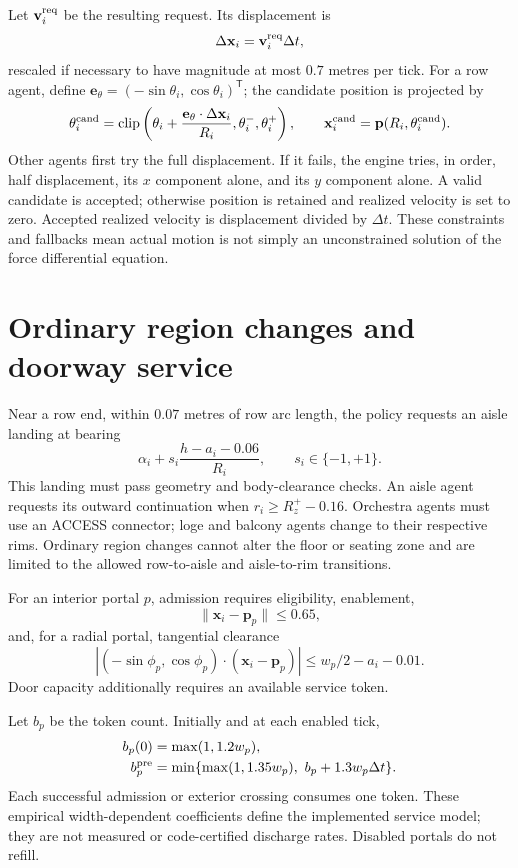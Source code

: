 \documentclass[11pt]{article}
\newcommand{\clip}{\operatorname{clip}}
\begin{document}
Let $\mathbf v_i^{\rm req}$ be the resulting request. Its displacement is
\[
 \Delta\mathbf x_i=\mathbf v_i^{\rm req}\Delta t,
\]
rescaled if necessary to have magnitude at most $0.7$ metres per tick.
For a row agent, define $\mathbf e_\theta=(-\sin\theta_i,\cos\theta_i)^{\mathsf T}$;
the candidate position is projected by
\[
 \theta_i^{\rm cand}=\clip\left(
 \theta_i+\frac{\mathbf e_\theta\cdot\Delta\mathbf x_i}{R_i},
 \theta_i^-,\theta_i^+\right),\qquad
 \mathbf x_i^{\rm cand}=\mathbf p(R_i,\theta_i^{\rm cand}).
\]
Other agents first try the full displacement. If it fails, the engine tries,
in order, half displacement, its $x$ component alone, and its $y$ component
alone. A valid candidate is accepted; otherwise position is retained and
realized velocity is set to zero. Accepted realized velocity is displacement
divided by $\Delta t$. These constraints and fallbacks mean actual motion is
not simply an unconstrained solution of the force differential equation.

\section{Ordinary region changes and doorway service}

Near a row end, within $0.07$ metres of row arc length, the policy requests an
aisle landing at bearing
\[
 \alpha_i+s_i\frac{h-a_i-0.06}{R_i},\qquad s_i\in\{-1,+1\}.
\]
This landing must pass geometry and body-clearance checks. An aisle agent
requests its outward continuation when $r_i\geq R_z^+-0.16$. Orchestra agents
must use an ACCESS connector; loge and balcony agents change to their respective
rims. Ordinary region changes cannot alter the floor or seating zone and are
limited to the allowed row-to-aisle and aisle-to-rim transitions.

For an interior portal $p$, admission requires eligibility, enablement,
\[
 \|\mathbf x_i-\mathbf p_p\|\leq0.65,
\]
and, for a radial portal, tangential clearance
\[
 |(-\sin\phi_p,\cos\phi_p)\cdot(\mathbf x_i-\mathbf p_p)|
       \leq w_p/2-a_i-0.01.
\]
Door capacity additionally requires an available service token.

Let $b_p$ be the token count. Initially and at each enabled tick,
\begin{align}
 b_p(0)&=\max(1,1.2w_p),\\
 b_p^{\rm pre}&=\min\{\max(1,1.35w_p),\ b_p+1.3w_p\Delta t\}.
\end{align}
Each successful admission or exterior crossing consumes one token. These
empirical width-dependent coefficients define the implemented service model;
they are not measured or code-certified discharge rates. Disabled portals
do not refill.
\end{document}
